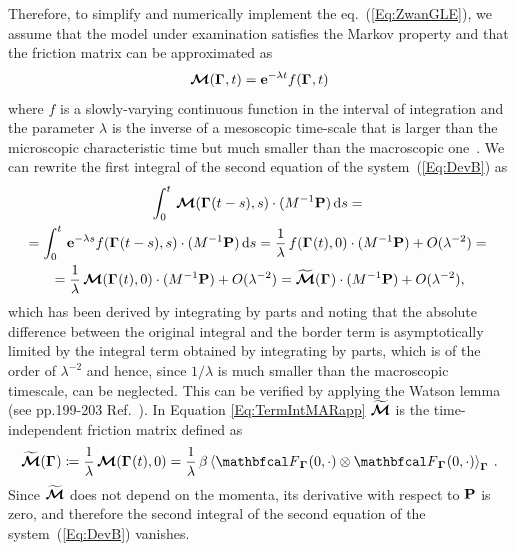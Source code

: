 \documentclass[10pt,a4paper]{book}
\theoremstyle{definition}
\begin{document}
Therefore, to simplify and numerically implement the eq.~(\ref{Eq:ZwanGLE}), we assume that the model under examination satisfies the Markov property and that the friction matrix can be approximated as
\begin{equation*}
  \boldsymbol{\mathcal{M}}(\boldsymbol\Gamma_{},t) = \mathbf{e}^{-\lambda t}f(\boldsymbol\Gamma_{},t)
\end{equation*}
where $f$ is a slowly-varying continuous function in the interval of integration and the parameter $\lambda$ is the inverse of a mesoscopic time-scale that is larger than the microscopic characteristic time but much smaller than the macroscopic one~\cite{Hijon2010}. We can rewrite the first integral of the second equation of the system~(\ref{Eq:DevB}) as 
\begin{multline}
\label{Eq:TermIntMARapp}
  \int_0^t\, \boldsymbol{\mathcal{M}}(\boldsymbol\Gamma_{}(t-s),s) \cdot(M^{-1}\mathbf{P}) \,\mbox{d} s ={}\\
   = \int_0^t\, \mathbf{e}^{-\lambda s}f(\boldsymbol\Gamma_{}(t-s),s) \cdot(M^{-1}\mathbf{P}) \,\mbox{d} s = \frac{1}{\lambda}\, f(\boldsymbol\Gamma_{}(t),0) \cdot (M^{-1}\mathbf{P}) 
   + O(\lambda^{-2}) ={}\\ 
   = \frac{1}{\lambda}\, \boldsymbol{\mathcal{M}}(\boldsymbol\Gamma_{}(t),0) \cdot (M^{-1}\mathbf{P}) + O(\lambda^{-2}) 
   =  \widetilde{\boldsymbol{\mathcal{M}}}(\boldsymbol\Gamma_{}) \cdot (M^{-1}\mathbf{P}) + O(\lambda^{-2}),
	\end{multline}
which has been derived by integrating by parts and noting that the absolute difference between the original integral and the border term is asymptotically limited by the integral term obtained by integrating by parts, which is of the order of $\lambda^{-2}$ and hence, since $1 / \lambda$ is much smaller than the macroscopic timescale, can be neglected. This can be verified by applying the Watson lemma (see pp.199-203 Ref.~\cite{bernardini1993Metodi}). In Equation \ref{Eq:TermIntMARapp} $\widetilde{\boldsymbol{\mathcal{M}}}$ is the time-independent friction matrix defined as
\begin{equation}\label{Eq:MarDeltaFric}
  \widetilde{\bffricmat}(\Bphase{}) \coloneqq \frac{1}{\lambda}\,\bffricmat(\Bphase{}(t),0)
  = \frac{1}{\lambda}\, \beta\aver{\fprojbf_{\Bphase{}}(0,\cdot)\otimes
    \fprojbf_{\Bphase{}}(0,\cdot)}_{\Bphase{}}\,.
\end{equation}
Since $\widetilde{\boldsymbol{\mathcal{M}}}$ does not depend on the momenta, its derivative with respect to ${\bf P}$ is zero, and therefore the second integral of the second equation of the system~(\ref{Eq:DevB}) vanishes.
\end{document}
